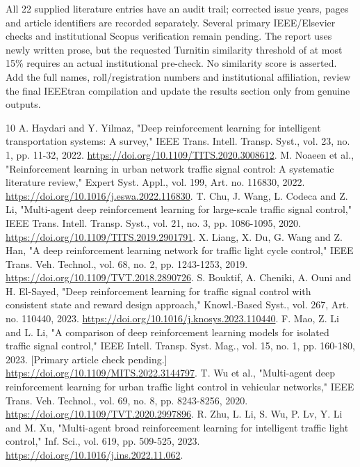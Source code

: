 \documentclass[conference]{IEEEtran}
\begin{document}
All 22 supplied literature entries have an audit trail; corrected issue years, pages and article identifiers are recorded separately. Several primary IEEE/Elsevier checks and institutional Scopus verification remain pending. The report uses newly written prose, but the requested Turnitin similarity threshold of at most 15\% requires an actual institutional pre-check. No similarity score is asserted. Add the full names, roll/registration numbers and institutional affiliation, review the final IEEEtran compilation and update the results section only from genuine outputs.

\begin{thebibliography}{10}
 A. Haydari and Y. Yilmaz, "Deep reinforcement learning for intelligent transportation systems: A survey," IEEE Trans. Intell. Transp. Syst., vol. 23, no. 1, pp. 11-32, 2022. \url{https://doi.org/10.1109/TITS.2020.3008612}.
 M. Noaeen et al., "Reinforcement learning in urban network traffic signal control: A systematic literature review," Expert Syst. Appl., vol. 199, Art. no. 116830, 2022. \url{https://doi.org/10.1016/j.eswa.2022.116830}.
 T. Chu, J. Wang, L. Codeca and Z. Li, "Multi-agent deep reinforcement learning for large-scale traffic signal control," IEEE Trans. Intell. Transp. Syst., vol. 21, no. 3, pp. 1086-1095, 2020. \url{https://doi.org/10.1109/TITS.2019.2901791}.
 X. Liang, X. Du, G. Wang and Z. Han, "A deep reinforcement learning network for traffic light cycle control," IEEE Trans. Veh. Technol., vol. 68, no. 2, pp. 1243-1253, 2019. \url{https://doi.org/10.1109/TVT.2018.2890726}.
 S. Bouktif, A. Cheniki, A. Ouni and H. El-Sayed, "Deep reinforcement learning for traffic signal control with consistent state and reward design approach," Knowl.-Based Syst., vol. 267, Art. no. 110440, 2023. \url{https://doi.org/10.1016/j.knosys.2023.110440}.
 F. Mao, Z. Li and L. Li, "A comparison of deep reinforcement learning models for isolated traffic signal control," IEEE Intell. Transp. Syst. Mag., vol. 15, no. 1, pp. 160-180, 2023. [Primary article check pending.] \url{https://doi.org/10.1109/MITS.2022.3144797}.
 T. Wu et al., "Multi-agent deep reinforcement learning for urban traffic light control in vehicular networks," IEEE Trans. Veh. Technol., vol. 69, no. 8, pp. 8243-8256, 2020. \url{https://doi.org/10.1109/TVT.2020.2997896}.
 R. Zhu, L. Li, S. Wu, P. Lv, Y. Li and M. Xu, "Multi-agent broad reinforcement learning for intelligent traffic light control," Inf. Sci., vol. 619, pp. 509-525, 2023. \url{https://doi.org/10.1016/j.ins.2022.11.062}.

\end{thebibliography}
\end{document}
